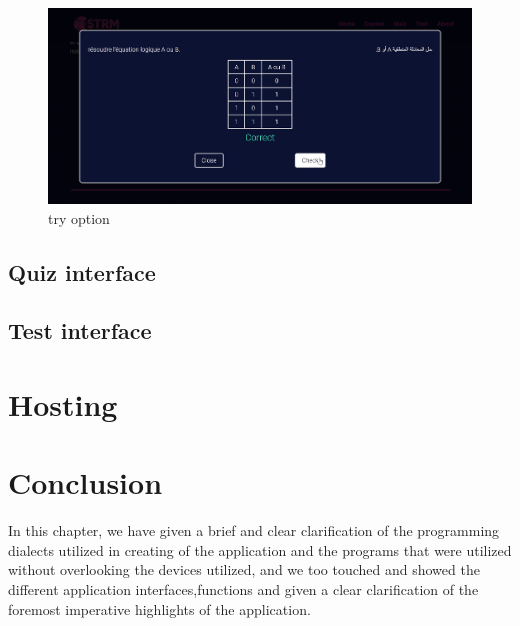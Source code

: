 \begin{figure}[ht]
	\centering
	\label{}\includegraphics[scale=0.5]{img/12.png}                
	\caption{try option} 
	\label{fig:try3}
\end{figure} 


\subsection{Quiz interface}

\subsection{Test interface}

\section{Hosting}

\section{Conclusion}
In this chapter, we have given a brief and clear clarification of the programming dialects utilized in creating of the application and the programs that were utilized without overlooking the devices utilized, and we too touched and showed the different application interfaces,functions and given a clear clarification of the foremost imperative highlights of the application.\\